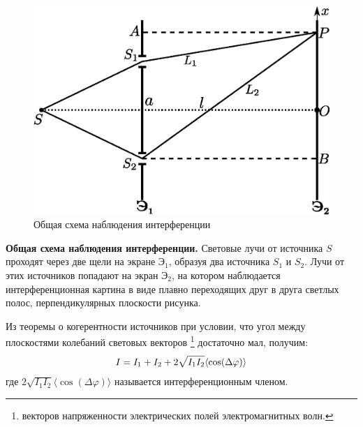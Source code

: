 \documentclass[__main__.tex]{subfiles}
\begin{document}
\begin{figure}
	\includegraphics[width=1\linewidth]{img/o-05_1}{}
	\caption{Общая схема наблюдения интерференции}
\end{figure}

\textbf{Общая схема наблюдения интерференции.}
Световые лучи от источника $S$ проходят через две щели на экране $\text{Э}_1$, образуя два источника $S_1$ и $S_2$. Лучи от этих источников попадают на экран $\text{Э}_2$, на котором наблюдается интерференционная картина в виде плавно переходящих друг в друга светлых полос, перпендикулярных плоскости рисунка.

Из теоремы о когерентности источников при условии, что угол между плоскостями колебаний световых векторов
\footnote{
	векторов напряженности электрических полей электромагнитных волн.
}
достаточно мал, получим:
\begin{gather}
\llabel{o-02-mainint}
I = I_1 + I_2 + 2\sqrt{I_1 I_2}\langle\cos(\Delta \varphi)\rangle
\end{gather}
где $2\sqrt{I_1 I_2}\langle\cos(\Delta \varphi)\rangle$ называется интерференционным членом.
\end{document}
